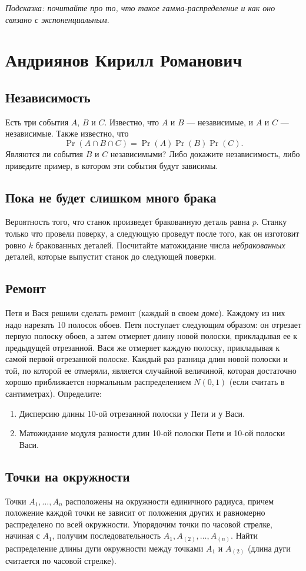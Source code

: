 \documentclass[12pt]{article}
\begin{document}
\emph{Подсказка: почитайте про то, что такое гамма-распределение и как оно связано с экспоненциальным.}

\newpage
\section{Андриянов Кирилл Романович}

\subsection{Независимость}
Есть три события $A$, $B$ и $C$. Известно, что $A$ и $B$ --- независимые, и $A$ и $C$ --- независимые. Также известно, что \[\Pr(A \cap B \cap C) = \Pr(A)\Pr(B)\Pr(C).\] Являются ли события $B$ и $C$ независимыми? Либо докажите независимость, либо приведите пример, в котором эти события будут зависимы.

\subsection{Пока не будет слишком много брака}
Вероятность того, что станок произведет бракованную деталь равна $p$. Станку только что провели поверку, а следующую проведут после того, как он изготовит ровно $k$ бракованных деталей. Посчитайте матожидание числа \emph{небракованных} деталей, которые выпустит станок до следующей поверки.

\subsection{Ремонт}
Петя и Вася решили сделать ремонт (каждый в своем доме). Каждому из них надо нарезать 10 полосок обоев. Петя поступает следующим образом: он отрезает первую полоску обоев, а затем отмеряет длину новой полоски, прикладывая ее к предыдущей отрезанной. Вася же отмеряет каждую полоску, прикладывая к самой первой отрезанной полоске. Каждый раз разница длин новой полоски и той, по которой ее отмеряли, является случайной величиной, которая достаточно хорошо приближается нормальным распределением $N(0, 1)$ (если считать в сантиметрах). Определите:
\begin{enumerate}
    \item Дисперсию длины 10-ой отрезанной полоски у Пети и у Васи.
    \item Матожидание модуля разности длин 10-ой полоски Пети и 10-ой полоски Васи. 
\end{enumerate}

\subsection{Точки на окружности}
Точки $A_1, \dots, A_n$ расположены на окружности единичного радиуса, причем положение каждой точки не зависит от положения других и равномерно распределено по всей окружности. Упорядочим точки по часовой стрелке, начиная с $A_1$, получим последовательность $A_1, A_{(2)}, \dots, A_{(n)}$. Найти распределение длины дуги окружности между точками $A_1$ и $A_{(2)}$ (длина дуги считается по часовой стрелке).
\end{document}
